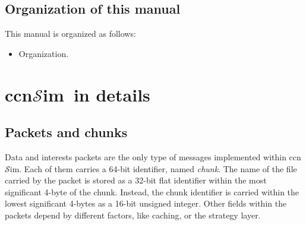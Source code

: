 \documentclass{article}
\newcommand{\ccnsim}{ccn$\mathcal{S}$im}
\begin{document}
\subsection{Organization of this manual}
This manual is organized as follows:
\begin{itemize}
    \item Organization.
\end{itemize}


\section{\ccnsim\ in details}
\subsection{Packets and chunks}
Data and interests packets are the only type of messages implemented within \ccnsim. Each of them carries a 64-bit identifier, named \emph{chunk}. The name of the file carried by the packet is stored as a 32-bit flat identifier within the most significant 4-byte of the chunk. Instead, the chunk identifier is carried within the lowest significant 4-bytes as a 16-bit unsigned integer. Other fields within the packets depend by different factors, like caching, or the strategy layer.
\end{document}
